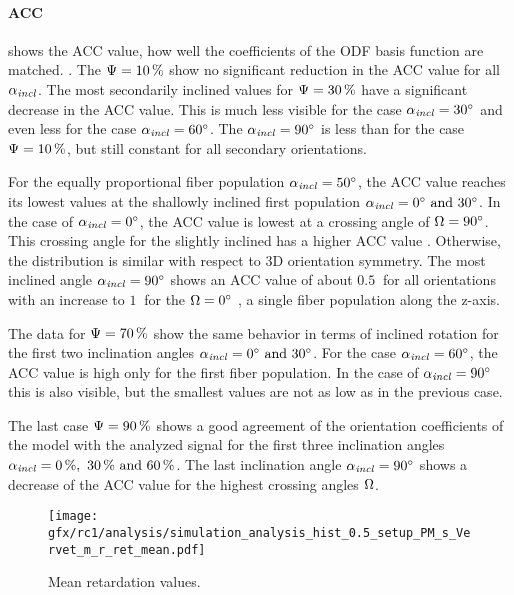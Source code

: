 \paragraph{\acs{ACC}}
 shows the  \ac{ACC} value, \ie{} how well the coefficients of the \ac{ODF} basis function are matched.
.
The $\textnormal{$\Psi$}=\SI{10}{\percent}$ show no significant reduction in the \ac{ACC} value for all $\textnormal{$\alpha_{\mathit{incl}}$}$.
The most secondarily inclined values for $\textnormal{$\Psi$}=\SI{30}{\percent}$ have a significant decrease in the \ac{ACC} value.
This is much less visible for the case $\textnormal{$\alpha_{\mathit{incl}}$} = \SI{30}{\degree}$ and even less for the case $\textnormal{$\alpha_{\mathit{incl}}$} = \SI{60}{\degree}$.
The $\textnormal{$\alpha_{\mathit{incl}}$} = \SI{90}{\degree}$ is less than for the case $\textnormal{$\Psi$}=\SI{10}{\percent}$, but still constant for all secondary orientations.
\par
%
For the equally proportional fiber population $\textnormal{$\alpha_{\mathit{incl}}$} = \SI{50}{\degree}$, the \ac{ACC} value reaches its lowest values at the shallowly inclined first population $\modelInc = \SIlist{0;30}{\degree}$.
In the case of $\textnormal{$\alpha_{\mathit{incl}}$} = \SI{0}{\degree}$, the \ac{ACC} value is lowest at a crossing angle of $\textnormal{$\Omega$} = \SI{90}{\degree}$.
This crossing angle for the slightly inclined has a higher \ac{ACC} value .
Otherwise, the distribution is similar with respect to 3D orientation symmetry.
The most inclined angle $\textnormal{$\alpha_{\mathit{incl}}$}=\SI{90}{\degree}$ shows an \ac{ACC} value of about $\SI{0.5}{}$ for all orientations with an increase to $\SI{1}{}$ for the $\textnormal{$\Omega$} = \SI{0}{\degree}$ ,\ie{} a single fiber population along the z-axis.
\par
%
The data for $\textnormal{$\Psi$}=\SI{70}{\percent}$ show the same behavior in terms of inclined rotation for the first two inclination angles $\modelInc = \SIlist{0;30}{\degree}$.
For the case $\textnormal{$\alpha_{\mathit{incl}}$}=\SI{60}{\degree}$, the \ac{ACC} value is high only for the first fiber population.
In the case of $\textnormal{$\alpha_{\mathit{incl}}$}=\SI{90}{\degree}$ this is also visible, but the smallest values are not as low as in the previous case.
\par
%
The last case $\textnormal{$\Psi$}=\SI{90}{\percent}$ shows a good agreement of the orientation coefficients of the model with the analyzed signal for the first three inclination angles $\modelInc=\SIlist{0;30;60}{\percent}$.
The last inclination angle $\textnormal{$\alpha_{\mathit{incl}}$}=\SI{90}{\degree}$ shows a decrease of the \ac{ACC} value for the highest crossing angles $\textnormal{$\Omega$}$.
%
%
%
\begin{figure}[!p]
\centering
\texttt{[image: gfx/rc1/analysis/simulation\_analysis\_hist\_0.5\_setup\_PM\_s\_Vervet\_m\_r\_ret\_mean.pdf]}
\caption{Mean retardation values. }
\label{fig:sim_ana_ret}
\end{figure}
%
